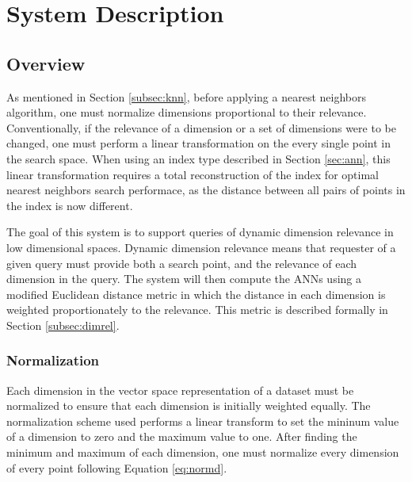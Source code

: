 \chapter{System Description} %

\label{sysdes} %


\section{Overview}
\label{sect:sysdesover}

As mentioned in Section \ref{subsec:knn}, before applying a nearest neighbors algorithm, one must normalize dimensions proportional to their relevance.  Conventionally, if the relevance of a dimension or a set of dimensions were to be changed, one must perform a linear transformation on the every single point in the search space.  When using an index type described in Section \ref{sec:ann}, this linear transformation requires a total reconstruction of the index for optimal nearest neighbors search performace, as the distance between all pairs of points in the index is now different.

The goal of this system is to support queries of dynamic dimension relevance in low dimensional spaces.  Dynamic dimension relevance means that requester of a given query must provide both a search point, and the relevance of each dimension in the query.  The system will then compute the ANNs using a modified Euclidean distance metric in which the distance in each dimension is weighted proportionately to the relevance.  This metric is described formally in Section \ref{subsec:dimrel}.

\subsection{Normalization}
\label{subsec:normalization}

Each dimension in the vector space representation of a dataset must be normalized to ensure that each dimension is initially weighted equally.  The normalization scheme used performs a linear transform to set the mininum value of a dimension to zero and the maximum value to one.  After finding the minimum and maximum of each dimension, one must normalize every dimension of every point following Equation \ref{eq:normd}.


